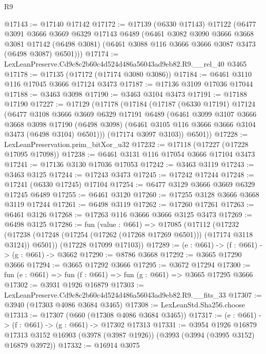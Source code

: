 \begin{lexlean}{R9}
\begin{coremodule}
@17143 := @17140 @17142
@17172 := @17139
    (@6330 @17143)
    @17122
    (@6477
      @3091
      @3666
      @3669
      @6329
      @17143
      @6489
      (@6461
        @3082
        @3090
        @3666
        @3668
        @3081
        @17142
        (@6498 @3081)
        (@6461 @3088 @116 @3666 @3666 @3087 @3473 (@6498 @3087) @6501)))
@17174 := LexLeanPreserve.Cd9c8c2b60c4d524d486a56043ad9eb82.R9.__rel_40 @3465
@17178 := @17135 (@17172 (@17174 @3080 @3086))
@17184 := @6461 @3110 @116 @17045 @3666 @17124 @3473
@17187 := @17136 @3109 @17036 @17044
@17188 := @3463 @3098
@17190 := @3463 @3104 @3473
@17191 := @17188 @17190
@17227 := @17129
    (@17178
      (@17184
        (@17187
          (@6330 @17191)
          @17124
          (@6477
            @3108
            @3666
            @3669
            @6329
            @17191
            @6489
            (@6461
              @3099
              @3107
              @3666
              @3668
              @3098
              @17190
              (@6498 @3098)
              (@6461 @3105 @116 @3666 @3666 @3104 @3473 (@6498 @3104) @6501)))
          (@17174 @3097 @3103))
        @6501))
@17228 := LexLeanPreservation.prim_bitXor_u32
@17232 := @17118 (@17227 (@17228 @17095 @17098))
@17238 := @6461 @3131 @116 @17054 @3666 @17104 @3473
@17241 := @17136 @3130 @17036 @17053
@17242 := @3463 @3119
@17243 := @3463 @3125
@17244 := @17243 @3473
@17245 := @17242 @17244
@17248 := @17241 (@6330 @17245) @17104
@17254 := @6477 @3129 @3666 @3669 @6329 @17245 @6489
@17255 := @6461 @3120
@17260 := @17255 @3128 @3666 @3668 @3119 @17244
@17261 := @6498 @3119
@17262 := @17260 @17261
@17263 := @6461 @3126
@17268 := @17263 @116 @3666 @3666 @3125 @3473
@17269 := @6498 @3125
@17286 := fun (value : @661) =>
  @17085
    (@17112
      (@17232 (@17238 (@17248 (@17254 (@17262 (@17268 @17269 @6501))) (@17174 @3118 @3124)) @6501))
      (@17228 @17099 @17103))
@17289 := (e : @661) -> (f : @661) -> (g : @661) -> @3662
@17290 := @8786 @3668
@17292 := @3665 @17290 @3666
@17294 := @3665 @17292 @3666
@17295 := @3672 @17294
@17300 := fun (e : @661) => fun (f : @661) => fun (g : @661) => @3665 @17295 @3666
@17302 := @3931 @1926 @16879
@17303 := LexLeanPreserve.Cd9c8c2b60c4d524d486a56043ad9eb82.R9.__fits_33
@17307 := @3940 (@17303 @4086 @3684 @3465)
@17308 := LexLeanStd.Sha256.choose
@17313 := @17307 (@660 (@17308 @4086 @3684 @3465))
@17317 := (e : @661) -> (f : @661) -> (g : @661) -> @17302 @17313
@17331 := @3954
    @1926
    @16879
    @17313
    @3152
    @16903
    (@3978 (@3987 @1926))
    (@3993 (@3994 (@3995 @3152) @16879 @3972))
@17332 := @16914 @3075

\end{coremodule}
\end{lexlean}
